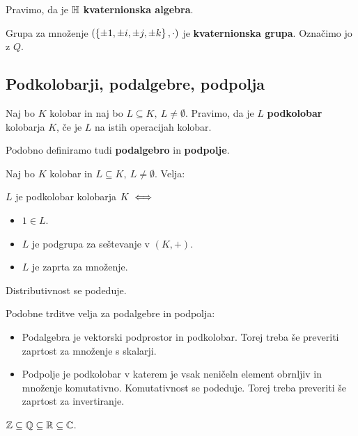 Pravimo, da je $\mathbb{H}$ \textbf{kvaternionska algebra}. 

Grupa za množenje $(\left\{\pm 1, \pm i, \pm j, \pm k\right\}, \cdot)$ je \textbf{kvaternionska grupa}. Označimo jo z $Q$.

\subsection{Podkolobarji, podalgebre, podpolja}
\begin{definicija}
    Naj bo $K$ kolobar in naj bo $L \subseteq K, \ L \neq \emptyset$. Pravimo, da je $L$ \textbf{podkolobar} kolobarja $K$, če je $L$ na istih operacijah kolobar.
\end{definicija}

\begin{opomba}
    Podobno definiramo tudi \textbf{podalgebro} in \textbf{podpolje}.
\end{opomba}

\begin{trditev}
    Naj bo $K$ kolobar in $L \subseteq K, \ L \neq \emptyset$. Velja: 

    $L$ je podkolobar kolobarja $K \iff$
    \begin{itemize}
        \item $1 \in L$.
        \item $L$ je podgrupa za seštevanje v $(K,+)$.
        \item $L$ je zaprta za množenje.
    \end{itemize}
\end{trditev}

\begin{opomba}
    Distributivnost se podeduje.
\end{opomba}

\begin{opomba}
    Podobne trditve velja za podalgebre in podpolja:
    \begin{itemize}
        \item Podalgebra je vektorski podprostor in podkolobar. Torej treba še preveriti zaprtost za množenje s skalarji.
        \item Podpolje je podkolobar v katerem je vsak neničeln element obrnljiv in množenje komutativno. Komutativnost se podeduje. Torej treba preveriti še zaprtost za invertiranje.
    \end{itemize}
\end{opomba}

\begin{primer}
    $\mathbb{Z} \subseteq \mathbb{Q} \subseteq \mathbb{R} \subseteq \mathbb{C}$.
\end{primer}

